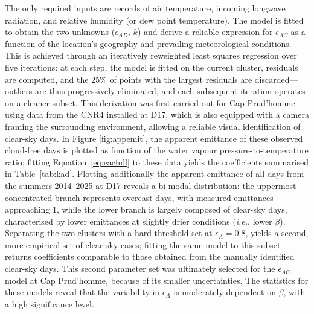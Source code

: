 \documentclass[11pt,a4paper]{article}
\newcommand{\ie}{\emph{i.e.}, }
\begin{document}
The only required inputs are records of air temperature, incoming longwave radiation, and relative humidity (or dew point temperature). The model is fitted to obtain the two unknowns ($\epsilon_{AD},\, k$) and derive a reliable expression for $\epsilon_{AC}$ as a function of the location's geography and prevailing meteorological conditions. This is achieved through an iteratively reweighted least squares regression over five iterations: at each step, the model is fitted on the current cluster, residuals are computed, and the 25\% of points with the largest residuals are discarded---outliers are thus progressively eliminated, and each subsequent iteration operates on a cleaner subset. This derivation was first carried out for Cap Prud'homme using data from the CNR4 installed at D17, which is also equipped with a camera framing the surrounding environment, allowing a reliable visual identification of clear-sky days. In Figure \ref{fig:appemit}, the apparent emittance of these observed cloud-free days is plotted as function of the water vapour pressure-to-temperature ratio; fitting Equation~\eqref{eq:eacfull} to these data yields the coefficients summarised in Table~\ref{tab:kad}. Plotting additionally the apparent emittance of all days from the summers 2014--2025 at D17 reveals a bi-modal distribution: the uppermost concentrated branch represents overcast days, with measured emittances approaching 1, while the lower branch is largely composed of clear-sky days, characterised by lower emittances at slightly drier conditions (\ie lower $\beta$). Separating the two clusters with a hard threshold set at $\epsilon_A = 0.8$, yields a second, more empirical set of clear-sky cases; fitting the same model to this subset returns coefficients comparable to those obtained from the manually identified clear-sky days. This second parameter set was ultimately selected for the $\epsilon_{AC}$ model at Cap Prud'homme, because of its smaller uncertainties. The statistics for these models reveal that the variability in $\epsilon_{A}$ is moderately dependent on $\beta$, with a high significance level.
\end{document}
